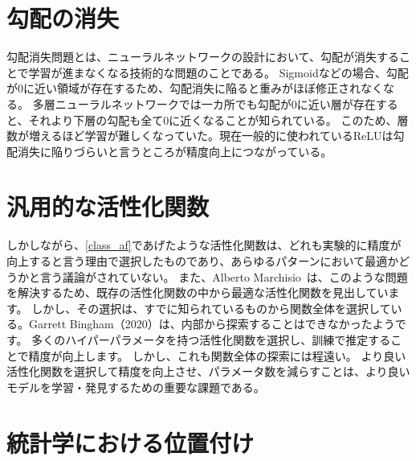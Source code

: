 \section{勾配の消失}
勾配消失問題とは、ニューラルネットワークの設計において、勾配が消失することで学習が進まなくなる技術的な問題のことである。
Sigmoidなどの場合、勾配が0に近い領域が存在するため、勾配消失に陥ると重みがほぼ修正されなくなる。
多層ニューラルネットワークでは一カ所でも勾配が0に近い層が存在すると、それより下層の勾配も全て0に近くなることが知られている。
このため、層数が増えるほど学習が難しくなっていた。現在一般的に使われているReLUは勾配消失に陥りづらいと言うところが精度向上につながっている。



\section{汎用的な活性化関数}

しかしながら、\ref{class_af}であげたような活性化関数は、どれも実験的に精度が向上すると言う理由で選択したものであり、あらゆるパターンにおいて最適かどうかと言う議論がされていない。
また、Alberto Marchisio~\cite{automatic_af}は、このような問題を解決するため、既存の活性化関数の中から最適な活性化関数を見出しています。
しかし、その選択は、すでに知られているものから関数全体を選択している。Garrett Bingham（2020）は、内部から探索することはできなかったようです。
多くのハイパーパラメータを持つ活性化関数を選択し、訓練で推定することで精度が向上します。 しかし、これも関数全体の探索には程遠い。
より良い活性化関数を選択して精度を向上させ、パラメータ数を減らすことは、より良いモデルを学習・発見するための重要な課題である。




\section{統計学における位置付け}

